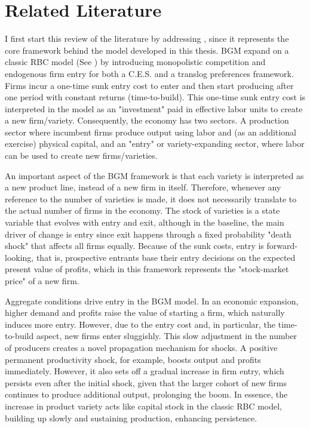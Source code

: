 \documentclass[a4paper,12pt]{article} %
\numberwithin{equation}{section} %
\numberwithin{figure}{section}
\numberwithin{table}{section}
\begin{document}
\section{Related Literature}
\label{sec:literature}



I first start this review of the literature by addressing \textcite{bilbiie2012endogenous}, since it represents the core framework behind the model developed in this thesis. 
BGM expand on a classic RBC model (See \cite{campbell1994inspecting}) by introducing monopolistic competition and endogenous firm entry for both a C.E.S. and a translog preferences framework. 
Firms incur a one-time sunk entry cost to enter and then start producing after one period with constant returns (time-to-build). 
This one-time sunk entry cost is interpreted in the model as an "investment" paid in effective labor units to create a new firm/variety. Consequently, the economy has two sectors. 
A production sector where incumbent firms produce output using labor and (as an additional exercise) physical capital, and an "entry" or variety-expanding sector, where labor can be used to create new firms/varieties. 

An important aspect of the BGM framework is that each variety is interpreted as a new product line, instead of a new firm in itself. 
Therefore, whenever any reference to the number of varieties is made, it does not necessarily translate to the actual number of firms in the economy. 
The stock of varieties is a state variable that evolves with entry and exit, although in the baseline, the main driver of change is entry 
since exit happens through a fixed probability "death shock" that affects all firms equally. Because of the sunk costs, entry is forward-looking,
that is, prospective entrants base their entry decisions on the expected present value of profits, which in this framework represents the "stock-market price" of a new firm. 

Aggregate conditions drive entry in the BGM model. In an economic expansion, higher demand and profits raise the value of starting a firm, which naturally induces more entry. 
However, due to the entry cost and, in particular, the time-to-build aspect, new firms enter sluggishly. This slow adjustment in the number of producers creates a novel 
propagation mechanism for shocks. A positive permanent productivity shock, for example, boosts output and profits immediately. However, it also sets off a gradual increase in firm entry, 
which persists even after the initial shock, given that the larger cohort of new firms continues to produce additional output, prolonging the boom. In essence, the increase in 
product variety acts like capital stock in the classic RBC model, building up slowly and sustaining production, enhancing persistence.
\end{document}
